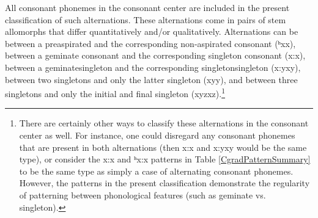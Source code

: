All consonant phonemes in the consonant center are included in the present classification of such alternations.
These alternations come in pairs of stem allomorphs that differ quantitatively and/or qualitatively. 
Alternations can be between a preaspirated and the corresponding non-aspirated consonant \mbox{(ʰx\Div x)},  
between a geminate consonant and the corresponding singleton consonant \mbox{(x:\Div x)}, 
between a geminate\PLUS singleton and the corresponding singleton\PLUS singleton \mbox{(x:y\Div xy)}, 
between two singletons and only the latter singleton \mbox{(xy\Div y)}, 
and between three singletons and only the initial and final singleton \mbox{(xyz\Div xz)}.\footnote{There are certainly other ways to classify these alternations in the consonant center as well. For instance, one could disregard any consonant phonemes that are present in both alternations (then \mbox{x:\Div x} and \mbox{x:y\Div xy} would be the same type), or consider the x:\Div x and ʰx:\Div x patterns in Table \ref{CgradPatternSummary} to be the same type as simply a case of alternating consonant phonemes. However, the patterns in the present classification demonstrate the regularity of patterning between phonological features (such as geminate vs. singleton).}  

